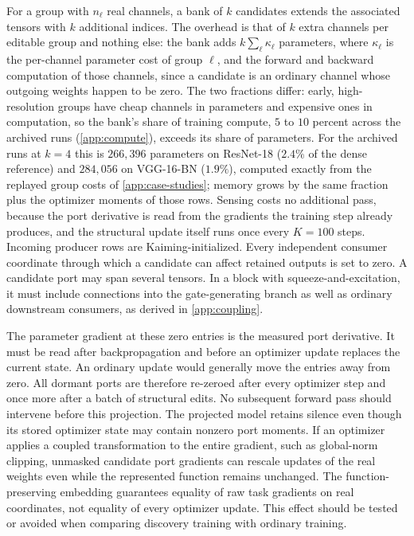 \documentclass[10pt]{article}
\theoremstyle{paper}
\begin{document}
For a group with $n_\ell$ real channels, a bank of $k$ candidates extends the associated tensors with $k$ additional indices. The overhead is that of $k$ extra channels per editable group and nothing else: the bank adds $k\sum_\ell\kappa_\ell$ parameters, where $\kappa_\ell$ is the per-channel parameter cost of group $\ell$, and the forward and backward computation of those channels, since a candidate is an ordinary channel whose outgoing weights happen to be zero. The two fractions differ: early, high-resolution groups have cheap channels in parameters and expensive ones in computation, so the bank's share of training compute, $5$ to $10$ percent across the archived runs (\cref{app:compute}), exceeds its share of parameters. For the archived runs at $k=4$ this is $266{,}396$ parameters on ResNet-18 ($2.4\%$ of the dense reference) and $284{,}056$ on VGG-16-BN ($1.9\%$), computed exactly from the replayed group costs of \cref{app:case-studies}; memory grows by the same fraction plus the optimizer moments of those rows. Sensing costs no additional pass, because the port derivative is read from the gradients the training step already produces, and the structural update itself runs once every $K=100$ steps. Incoming producer rows are Kaiming-initialized. Every independent consumer coordinate through which a candidate can affect retained outputs is set to zero. A candidate port may span several tensors. In a block with squeeze-and-excitation, it must include connections into the gate-generating branch as well as ordinary downstream consumers, as derived in \cref{app:coupling}.

The parameter gradient at these zero entries is the measured port derivative. It must be read after backpropagation and before an optimizer update replaces the current state. An ordinary update would generally move the entries away from zero. All dormant ports are therefore re-zeroed after every optimizer step and once more after a batch of structural edits. No subsequent forward pass should intervene before this projection. The projected model retains silence even though its stored optimizer state may contain nonzero port moments. If an optimizer applies a coupled transformation to the entire gradient, such as global-norm clipping, unmasked candidate port gradients can rescale updates of the real weights even while the represented function remains unchanged. The function-preserving embedding guarantees equality of raw task gradients on real coordinates, not equality of every optimizer update. This effect should be tested or avoided when comparing discovery training with ordinary training.
\end{document}
